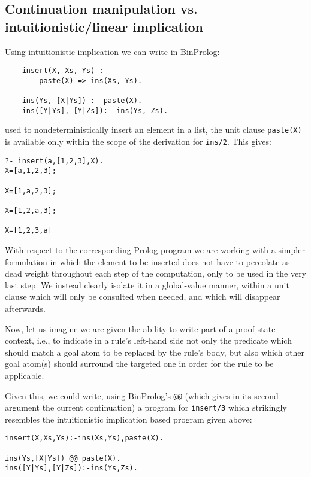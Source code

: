 \documentclass{article}
\begin{document}
\subsection{Continuation manipulation vs. intuitionistic/linear implication}

Using intuitionistic implication we can write in BinProlog:

\begin{verbatim}
    insert(X, Xs, Ys) :- 
        paste(X) => ins(Xs, Ys). 

    ins(Ys, [X|Ys]) :- paste(X).
    ins([Y|Ys], [Y|Zs]):- ins(Ys, Zs).
\end{verbatim}

{\flushleft used} to nondeterministically insert an element in a list,
the unit clause {\tt paste(X)} is available only within the scope of the
derivation for {\tt ins/2}. This gives:

{\small
\begin{verbatim}
?- insert(a,[1,2,3],X).
X=[a,1,2,3];

X=[1,a,2,3];

X=[1,2,a,3];

X=[1,2,3,a]
\end{verbatim}
}

With respect to the corresponding Prolog program
we are working with a simpler
formulation in which the element to be inserted does not have to percolate
as dead weight throughout each step of the computation, only to be used in
the very last step. We instead clearly isolate it in a global-value manner,
within a unit clause which will only be consulted when needed, and which
will disappear afterwards.

Now, let us imagine we are given the ability to write part of a proof state
context, i.e., to indicate in a rule's left-hand side not only the
predicate which should match a goal atom to be replaced by the rule's body,
but also which other goal atom(s) should surround the targeted one in
order for the rule to be applicable. 

Given this, we could write, using BinProlog's {\tt @@}
(which gives in its second argument the current continuation) a program
for {\tt insert/3} which strikingly resembles the intuitionistic
implication based program given above:

{\small
\begin{verbatim}
insert(X,Xs,Ys):-ins(Xs,Ys),paste(X).

ins(Ys,[X|Ys]) @@ paste(X).
ins([Y|Ys],[Y|Zs]):-ins(Ys,Zs).
\end{verbatim}
}
\end{document}
